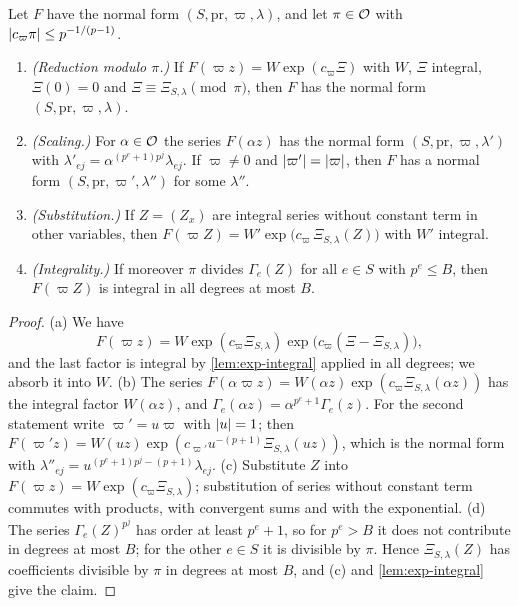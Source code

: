 \begin{proposition}\label{prop:normal-form-rules}
Let $F$ have the normal form $(S,\mathrm{pr},\varpi,\lambda)$, and let $\pi\in\mathcal{O}$ with
$\lvert c_\varpi\pi\rvert\le p^{-1/(p-1)}$.
\begin{enumerate}[label=\textup{(\alph*)}]
\item\label{it:nf-mod} \emph{(Reduction modulo $\pi$.)} If $F(\varpi z)=W\exp(c_\varpi\Xi)$ with $W$,
$\Xi$ integral, $\Xi(0)=0$ and $\Xi\equiv\Xi_{S,\lambda}\pmod\pi$, then $F$ has the normal form
$(S,\mathrm{pr},\varpi,\lambda)$.
\item\label{it:nf-scale} \emph{(Scaling.)} For $\alpha\in\mathcal{O}$ the series $F(\alpha z)$ has the normal
form $(S,\mathrm{pr},\varpi,\lambda')$ with $\lambda'_{ej}=\alpha^{(p^e+1)p^j}\lambda_{ej}$. If
$\varpi\ne0$ and $\lvert \varpi'\rvert=\lvert \varpi\rvert$, then $F$ has a normal form
$(S,\mathrm{pr},\varpi',\lambda'')$ for some $\lambda''$.
\item\label{it:nf-subst} \emph{(Substitution.)} If $Z=(Z_x)$ are integral series without constant term
in other variables, then $F(\varpi Z)=W'\exp\bigl(c_\varpi\,\Xi_{S,\lambda}(Z)\bigr)$ with $W'$
integral.
\item\label{it:nf-integral} \emph{(Integrality.)} If moreover $\pi$ divides $\Gamma_e(Z)$ for all $e\in S$
with $p^e\le B$, then $F(\varpi Z)$ is integral in all degrees at most $B$.
\end{enumerate}
\end{proposition}

\begin{proof}
(a) We have
\[
  F(\varpi z)=W\exp(c_\varpi\Xi_{S,\lambda})\exp\bigl(c_\varpi(\Xi-\Xi_{S,\lambda})\bigr),
\]
and the last factor is integral by \cref{lem:exp-integral} applied in all degrees; we absorb it into
$W$. (b) The series $F(\alpha\varpi z)=W(\alpha z)\exp(c_\varpi\Xi_{S,\lambda}(\alpha z))$ has the
integral factor $W(\alpha z)$, and $\Gamma_e(\alpha z)=\alpha^{p^e+1}\Gamma_e(z)$. For the second statement write $\varpi'=u\varpi$
with $\lvert u\rvert=1$; then $F(\varpi'z)=W(uz)\exp(c_{\varpi'}u^{-(p+1)}\Xi_{S,\lambda}(uz))$, which is the
normal form with $\lambda''_{ej}=u^{(p^e+1)p^j-(p+1)}\lambda_{ej}$.
(c) Substitute $Z$ into $F(\varpi z)=W\exp(c_\varpi\Xi_{S,\lambda})$; substitution of series without
constant term commutes with products, with convergent sums and with the exponential.
(d) The series $\Gamma_e(Z)^{p^j}$ has order at least $p^e+1$, so for $p^e>B$ it does not contribute
in degrees at most $B$; for the other $e\in S$ it is divisible by $\pi$. Hence $\Xi_{S,\lambda}(Z)$ has
coefficients divisible by $\pi$ in degrees at most $B$, and (c) and \cref{lem:exp-integral} give the
claim.
\end{proof}

